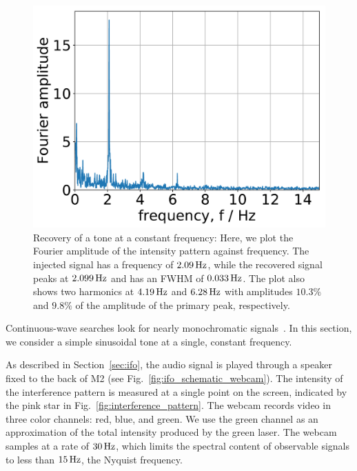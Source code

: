 \documentclass[paper-main.tex]{subfiles}
\begin{document}
\begin{figure}
	\includegraphics[width=.5\textwidth]{figures/webcam_spectrum_expt_4_0209.pdf}
	\caption{\label{fig:webcam_spectrum}
Recovery of a tone at a constant frequency: Here, we plot the Fourier amplitude of the intensity pattern against frequency.
The injected signal has a frequency of $2.09\,{\rm Hz}$, while the recovered signal peaks at $2.099\,{\rm Hz}$ and has an FWHM of $0.033\,{\rm Hz}$.
The plot also shows two harmonics at $4.19\,{\rm Hz}$ and $6.28\,{\rm Hz}$ with amplitudes $10.3 \%$ and $9.8 \%$ of the amplitude of the primary peak, respectively.
}	
\end{figure}



Continuous-wave searches look for nearly monochromatic signals~\cite{JKS:1998}. In this section, we consider a simple sinusoidal tone at a single, constant frequency. %

As described in Section~\ref{sec:ifo}, the audio signal is played through a speaker fixed to the back of M2 (see Fig.~\ref{fig:ifo_schematic_webcam}). 
The intensity of the interference pattern is measured at a single point on the screen, indicated by the pink star in Fig.~\ref{fig:interference_pattern}. 
The webcam records video in three color channels: red, blue, and green. 
We use the green channel as an approximation of the total intensity produced by the green laser.
The webcam samples at a rate of $30\, {\rm Hz}$, which limits the spectral content of observable signals to less than $15\,{\rm Hz}$, the Nyquist frequency. 


\end{document}
